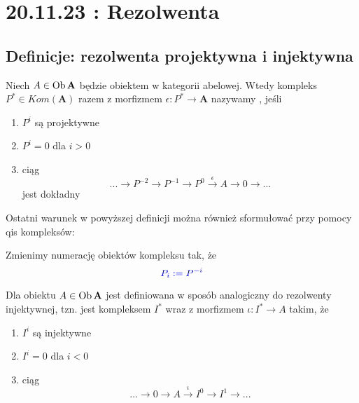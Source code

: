 \section{20.11.23 : Rezolwenta}

\subsection{Definicje: rezolwenta projektywna i injektywna}

\begin{definition}
  Niech $A\in\operatorname{Ob} \mathbf{A}$ będzie obiektem w kategorii abelowej. Wtedy kompleks $P^* \in Kom(\mathbf{A})$ razem z morfizmem $\epsilon:P^*\to\mathbf{A}$ nazywamy , jeśli
  \begin{enumerate}
    \item $P^i$ są projektywne 
    \item $P^i=0$ dla $i>0$ 
    \item ciąg 
      $$...\to P^{-2}\to P^{-1}\to P^0\xrightarrow{\epsilon} A\to 0\to ...$$
      jest dokładny
  \end{enumerate}
\end{definition}

Ostatni warunek w powyższej definicji można również sformułować przy pomocy qis kompleksów:
\begin{center}\end{center}

Zmienimy numerację obiektów kompleksu tak, że 
$$\color{blue}P_i:=P^{-i}$$

\begin{definition}
  Dla obiektu $A\in\operatorname{Ob}\mathbf{A}$ jest definiowana w sposób analogiczny do rezolwenty injektywnej, tzn. jest kompleksem $I^*$ wraz z morfizmem $\iota : I^*\to A$ takim, że 
  \begin{enumerate}
    \item $I^i$ są injektywne 
    \item $I^i=0$ dla $i<0$ 
    \item ciąg 
      $$...\to 0\to A\xrightarrow{\iota} I^0\to I^1\to... $$
  \end{enumerate}
\end{definition}

